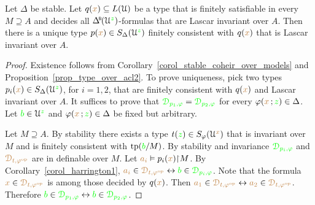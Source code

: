 \begin{theorem}[ (Stationarity)]\label{thm_stationarity}
  Let $\Delta$ be stable.
  Let $q({\color{brown} x})\subseteq L(\EuScript U)$ be a type that is finitely satisfiable in every $M\supseteq A$ and decides all $\BDelta(\U^{\gr z})$-formulas that are Lascar invariant over $A$.
  Then there is a unique type $p({\color{brown} x})\in S_\Delta(\EuScript U^{\color{green} z})$ finitely consistent with $q({\color{brown} x})$ that is Lascar invariant over $A$.
\end{theorem}

\begin{proof}
  Existence follows from Corollary~\ref{corol_stable_coheir_over_models} and Proposition~\ref{prop_type_over_acl2}.
  To prove uniqueness, pick two types $p_i({\color{brown} x})\in S_\Delta(\EuScript U^{\color{green} z})$, for $i=1,2$, that are finitely consistent with $q({\color{brown} x})$ and Lascar invariant over $A$.
  It suffices to prove that ${\color{green}\EuScript D_{p_1,\varphi}}={\color{green}\EuScript D_{p_2,\varphi}}$ for every $\varphi({\color{brown} x}\,;{\color{green} z})\in\Delta$.
  Let ${\color{green} b}\in\EuScript U^{\color{green} z}$ and $\varphi({\color{brown} x}\,;{\color{green} z})\in\Delta$ be fixed but arbitrary.

  Let $M\supseteq A$.
  By stability there exists a type $t({\color{green} z})\in S_\varphi(\EuScript U^{\color{brown} x})$ that is invariant over $M$ and is finitely consistent with ${\rm tp}({\color{green} b}/M)$.
  By stability and invariance ${\color{green}\EuScript D_{p_i,\varphi}}$ and ${\color{brown}\EuScript D_{t,\varphi^{\rm op}}}$ are in definable over $M$.
  Let ${\color{brown} a_i}\vDash p_i({\color{brown} x}){\restriction}M$.
  By Corollary~\ref{corol_harrington1}, ${\color{brown} a_i}\in{\color{brown}\EuScript D_{t,\varphi^{\rm op}}}\leftrightarrow{\color{green}b}\in{\color{green}\EuScript D_{p_i,\varphi}}$.
  Note that the formula ${\color{brown} x}\in{\color{brown}\EuScript D_{t,\varphi^{\rm op}}}$ is among those decided by $q({\color{brown} x})$.
  Then ${\color{brown} a_1}\in{\color{brown}\EuScript D_{t,\varphi^{\rm op}}}\leftrightarrow{\color{brown}a_2}\in{\color{brown}\EuScript D_{t,\varphi^{\rm op}}}$.
  Therefore ${\color{green} b}\in{\color{green}\EuScript D_{p_1,\varphi}}\leftrightarrow{\color{green}b}\in{\color{green}\EuScript D_{p_2,\varphi}}$.
\end{proof}



